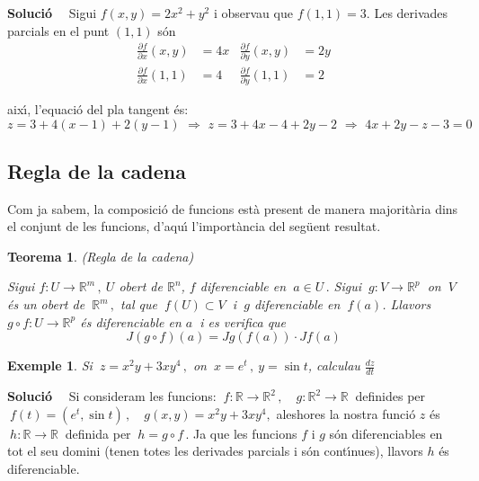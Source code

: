 \documentclass[12pt]{article}
\newcommand{\solucio}{\textbf{Soluci{\'o}}\ \ }
\newtheorem{teorema}{Teorema}[subsection]
\newtheorem{exemple}{Exemple}[subsection]
\newcommand{\R}{\mathbb{R}}
\begin{document}
\solucio
Sigui $f(x,y)=2x^{2}+y^{2}$ i observau que $f(1,1)=3$. Les derivades parcials en el punt $(1,1)$ s{\'o}n
\begin{align*}
\frac{\partial f}{\partial x}(x,y) & =4x & \frac{\partial
f}{\partial y}(x,y) & =2y \\ \frac{\partial f}{\partial x}(1,1) &
=4 & \frac{\partial f}{\partial y}(1,1) & =2
\end{align*}

aix{\'\i}, l'equaci{\'o} del pla tangent {\'e}s:
\vspace{0.4cm}\begin{equation*}
z = 3+4(x-1)+2(y-1) \,\, \Longrightarrow  \, \, z=3+4x-4+2y-2 \,\,
\Longrightarrow  \, \, 4x+2y-z-3=0
\end{equation*}

\subsection{Regla de la cadena}
Com ja sabem, la composici{\'o} de funcions est{\`a} present de manera majorit{\`a}ria dins el conjunt de les funcions, d'aqu{\'\i} l'import{\`a}ncia del seg{\"u}ent resultat.

\vspace{0.4cm}
\begin{teorema} (Regla de la cadena)

Sigui  $f:U \longrightarrow
\R^m\,,\ U$ obert de $\R^n$, $f$ diferenciable en $\ a \in U\,.$ Sigui $\ g:V
\longrightarrow \R^p\ $ on $\ V\ $ {\'e}s un obert de $\ \R^m\,, $ tal que $\ f(U)
\subset V\ $ i $\ g$ diferenciable en $\ f(a)$. Llavors $g\circ
f:U \longrightarrow \R^p$ {\'e}s diferenciable en $a\ $ i es verifica que
\[
J(g\circ f)(a) = Jg(f(a)) \cdot Jf(a)
\]
\end{teorema}


\vspace{0.4cm}
\begin{exemple}
Si $\ z=x^2y+3xy^4\,,$ on $\ x=e^t\,,\ y=\sin t$, calculau
$\displaystyle\frac{dz}{dt}$
\end{exemple}

\solucio
Si consideram les funcions: $\ f:\R\longrightarrow \R^2\,,\quad g:\R^2\longrightarrow \R\ $ definides per $\ f(t)=(e^t,\sin t)\,, \quad g(x,y)=x^2y+3xy^4,$ aleshores la nostra funci{\'o} $z$ {\'e}s $\ h:\R\longrightarrow \R\ $ definida per $\ h=g\circ f\,.$ Ja que les funcions $f$ i $g$ s{\'o}n diferenciables en tot el seu domini (tenen totes les derivades parcials i s{\'o}n cont{\'\i}nues), llavors  $h$ {\'e}s diferenciable.
\end{document}
